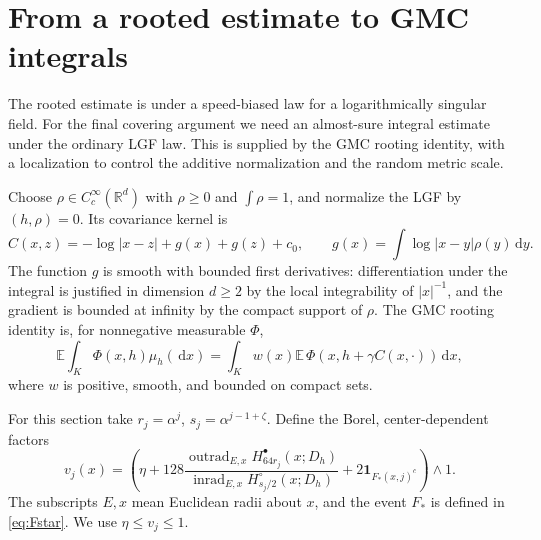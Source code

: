 \documentclass[11pt,reqno]{amsart}
\theoremstyle{plain}
\theoremstyle{definition}
\theoremstyle{remark}
\newcommand{\R}{\mathbb R}
\newcommand{\E}{\mathbb E}
\newcommand{\inrad}{\operatorname{inrad}}
\newcommand{\outrad}{\operatorname{outrad}}
\newcommand{\1}{\mathbf{1}}
\newcommand{\dd}{\,\mathrm d}
\begin{document}
\section{From a rooted estimate to GMC integrals}\label{sec:rooting}
The rooted estimate is under a speed-biased law for a logarithmically singular field. For the final covering argument we need an almost-sure integral estimate under the ordinary LGF law. This is supplied by the GMC rooting identity, with a localization to control the additive normalization and the random metric scale.

Choose $\rho\in C_c^\infty(\R^d)$ with $\rho\ge0$ and $\int\rho=1$, and normalize the LGF by $(h,\rho)=0$. Its covariance kernel is
\begin{equation}\label{eq:cov-smooth}
C(x,z)=-\log|x-z|+g(x)+g(z)+c_0,
\qquad g(x)=\int\log|x-y|\rho(y)\dd y.
\end{equation}
The function $g$ is smooth with bounded first derivatives: differentiation under the integral is justified in dimension $d\ge2$ by the local integrability of $|x|^{-1}$, and the gradient is bounded at infinity by the compact support of $\rho$. The GMC rooting identity \cite{RV} is, for nonnegative measurable $\Phi$,
\begin{equation}\label{eq:girsanov}
\E\int_K\Phi(x,h)\mu_h(\dd x)
=\int_Kw(x)\E\,\Phi(x,h+\gamma C(x,\cdot))\dd x,
\end{equation}
where $w$ is positive, smooth, and bounded on compact sets.

For this section take $r_j=\alpha^j$, $s_j=\alpha^{j-1+\zeta}$. Define the Borel, center-dependent factors
\begin{equation}\label{eq:v-global}
v_j(x)=\left(\eta+128\frac{\outrad_{E,x}H_{64r_j}^\bullet(x;D_h)}
{\inrad_{E,x}H_{s_j/2}^\circ(x;D_h)}
+2\1_{F_*(x,j)^c}\right)\wedge1.
\end{equation}
The subscripts $E,x$ mean Euclidean radii about $x$, and the event $F_*$ is defined in \eqref{eq:Fstar}. We use $\eta\le v_j\le1$.
\end{document}
